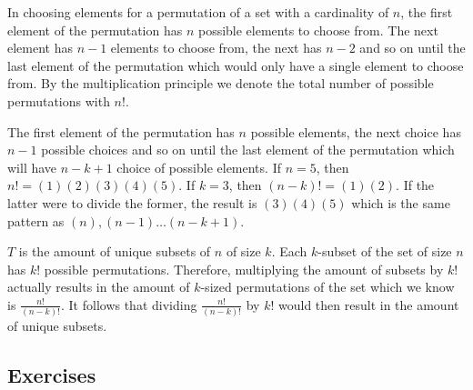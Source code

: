 \documentclass[12pt]{report}
\begin{document}
In choosing elements for a permutation of a set with a cardinality of $n$, the first element of the permutation has $n$ possible elements to choose from. The next element has $n-1$ elements to choose from, the next has $n-2$ and so on until the last element of the permutation which would only have a single element to choose from. By the multiplication principle we denote the total number of possible permutations with $n!$.\medskip

\medskip

The first element of the permutation has $n$ possible elements, the next choice has $n-1$ possible choices and so on until the last element of the permutation which will have $n-k+1$ choice of possible elements. If $n=5$, then $n!=(1)(2)(3)(4)(5)$. If $k=3$, then $(n-k)!=(1)(2)$. If the latter were to divide the former, the result is $(3)(4)(5)$ which is the same pattern as $(n),(n-1) \dots (n-k+1)$.\bigskip

\bigskip

$T$ is the amount of unique subsets of $n$ of size $k$. Each $k$-subset of the set of size $n$ has $k!$ possible permutations. Therefore, multiplying the amount of subsets by $k!$ actually results in the amount of $k$-sized permutations of the set which we know is $\frac{n!}{(n-k)!}$. It follows that dividing $\frac{n!}{(n-k)!}$ by $k!$ would then result in the amount of unique subsets.

\subsection{Exercises}



\end{document}

